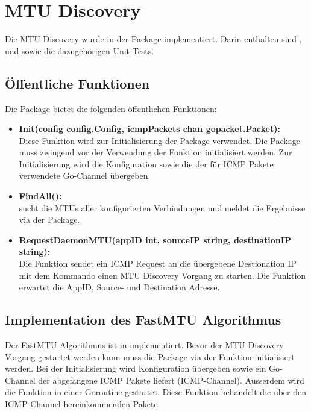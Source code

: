\section{MTU Discovery}
\label{sec:MTU Discovery}

Die \ac{MTU} Discovery wurde in der  Package implementiert. Darin enthalten sind ,  und  sowie die dazugehörigen Unit Tests.

\subsection{Öffentliche Funktionen}
Die  Package bietet die folgenden öffentlichen Funktionen:

\begin{itemize}
\item \textbf{Init(config config.Config, icmpPackets chan gopacket.Packet):} \\
Diese Funktion wird zur Initialisierung der  Package verwendet. Die Package muss zwingend vor der Verwendung der  Funktion initialisiert werden. Zur Initialisierung wird die Konfiguration sowie die der für \ac{ICMP} Pakete verwendete Go-Channel übergeben.
\item \textbf{FindAll():} \\
 sucht die \ac{MTU}s aller konfigurierten Verbindungen und meldet die Ergebnisse via der  Package.
\item \textbf{RequestDaemonMTU(appID int, sourceIP string, destinationIP string):} \\
Die Funktion  sendet ein ICMP Request an die übergebene Destionation IP mit dem Kommando einen \ac{MTU} Discovery Vorgang zu starten. Die Funktion erwartet die AppID, Source- und Destination Adresse.
\end{itemize}

\subsection{Implementation des FastMTU Algorithmus}
Der FastMTU Algorithmus ist in  implementiert. Bevor der \ac{MTU} Discovery Vorgang gestartet werden kann muss die  Package via der  Funktion initialisiert werden. Bei der Initialisierung wird Konfiguration übergeben sowie ein Go-Channel der abgefangene \ac{ICMP} Pakete liefert (ICMP-Channel). Ausserdem wird die Funktion  in einer Goroutine gestartet. Diese Funktion behandelt die über den ICMP-Channel hereinkommenden Pakete.

